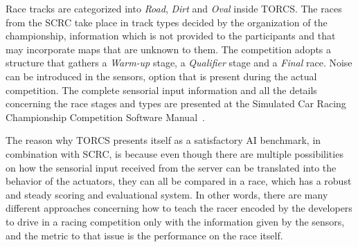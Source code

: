 	Race tracks are categorized into \emph{Road}, \emph{Dirt} and \emph{Oval} inside TORCS. The races from the SCRC take place in track types decided by the organization of the championship, information which is not provided to the participants and that may incorporate maps that are unknown to them. The competition adopts a structure that gathers a \textit{Warm-up} stage, a \textit{Qualifier} stage and a \textit{Final} race. Noise can be introduced in the sensors, option that is present during the actual competition. The complete sensorial input information and all the details concerning the race stages and types are presented at the Simulated Car Racing Championship Competition Software Manual~\cite{SCRC}.
	
	The reason why TORCS presents itself as a satisfactory AI benchmark, in combination with SCRC, is because even	though there are multiple possibilities on how the sensorial input received from the server can be translated into the behavior of the actuators, they can all be compared in a race, which has a robust and steady scoring and evaluational system. In other words, there are many different approaches concerning how to teach the racer encoded by the developers to drive in a racing competition only with the information given by the sensors, and the metric to that issue is the performance on the race itself.

